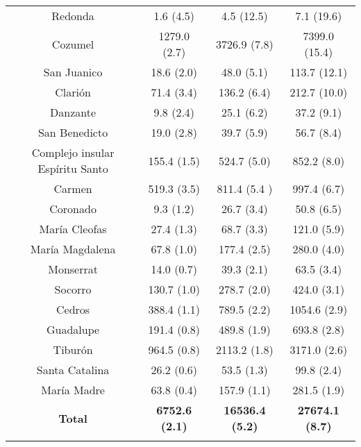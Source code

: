 \documentclass{article} %
\begin{document}
\begin{table}
\begin{center}
\begin{tabular}{cccc}
Redonda & 1.6 (4.5) & 4.5 (12.5) & 7.1 (19.6) \\ 
 
Cozumel & 1279.0 (2.7) & 3726.9 (7.8) & 7399.0 (15.4) \\ 

San Juanico & 18.6 (2.0) & 48.0 (5.1) & 113.7 (12.1) \\ 

Clarión & 71.4 (3.4) & 136.2 (6.4) & 212.7 (10.0) \\ 

Danzante & 9.8 (2.4) & 25.1 (6.2) & 37.2 (9.1) \\ 

San Benedicto & 19.0 (2.8) & 39.7 (5.9) & 56.7 (8.4) \\ 
 
Complejo insular Espíritu Santo & 155.4 (1.5) & 524.7 (5.0) & 852.2 (8.0) \\ 

Carmen & 519.3 (3.5) & 811.4 (5.4 ) & 997.4 (6.7) \\ 

Coronado & 9.3 (1.2) & 26.7 (3.4) & 50.8 (6.5) \\ 

María Cleofas & 27.4 (1.3) & 68.7 (3.3) & 121.0 (5.9) \\ 

María Magdalena & 67.8 (1.0) & 177.4 (2.5) & 280.0 (4.0) \\ 

Monserrat & 14.0 (0.7) & 39.3 (2.1) & 63.5 (3.4) \\ 
 
Socorro & 130.7 (1.0) & 278.7 (2.0) & 424.0 (3.1) \\ 
 
Cedros & 388.4 (1.1) & 789.5 (2.2) & 1054.6 (2.9) \\ 

Guadalupe & 191.4 (0.8) & 489.8 (1.9) & 693.8 (2.8) \\ 

Tiburón & 964.5 (0.8) & 2113.2 (1.8) & 3171.0 (2.6) \\ 

Santa Catalina & 26.2 (0.6) & 53.5 (1.3) & 99.8 (2.4) \\ 

María Madre & 63.8 (0.4) & 157.9 (1.1) & 281.5 (1.9) \\ 
\hline 
\textbf{Total} & \textbf{6752.6 (2.1)} & \textbf{16536.4 (5.2)} & \textbf{27674.1 (8.7)} \\ 
\hline 
\label{Tab:tab3} 
\end{tabular}
\end{center} 
\end{table}
\end{document}
